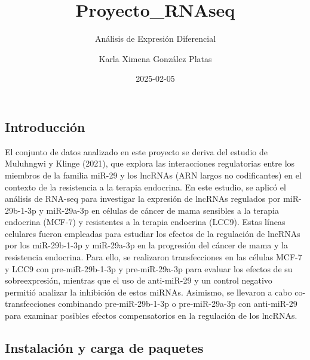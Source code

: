 \documentclass[
]{article}
\title{Proyecto\_RNAseq}
\subtitle{Análisis de Expresión Diferencial}
\author{Karla Ximena González Platas}
\date{2025-02-05}
\begin{document}
\maketitle

{
\setcounter{tocdepth}{2}
\tableofcontents
}
\subsection{Introducción}\label{introducciuxf3n}

El conjunto de datos analizado en este proyecto se deriva del estudio de
Muluhngwi y Klinge (2021), que explora las interacciones regulatorias
entre los miembros de la familia miR-29 y los lncRNAs (ARN largos no
codificantes) en el contexto de la resistencia a la terapia endocrina.
En este estudio, se aplicó el análisis de RNA-seq para investigar la
expresión de lncRNAs regulados por miR-29b-1-3p y miR-29a-3p en células
de cáncer de mama sensibles a la terapia endocrina (MCF-7) y resistentes
a la terapia endocrina (LCC9). Estas líneas celulares fueron empleadas
para estudiar los efectos de la regulación de lncRNAs por los
miR-29b-1-3p y miR-29a-3p en la progresión del cáncer de mama y la
resistencia endocrina. Para ello, se realizaron transfecciones en las
células MCF-7 y LCC9 con pre-miR-29b-1-3p y pre-miR-29a-3p para evaluar
los efectos de su sobreexpresión, mientras que el uso de anti-miR-29 y
un control negativo permitió analizar la inhibición de estos miRNAs.
Asimismo, se llevaron a cabo co-transfecciones combinando
pre-miR-29b-1-3p o pre-miR-29a-3p con anti-miR-29 para examinar posibles
efectos compensatorios en la regulación de los lncRNAs.

\subsection{Instalación y carga de
paquetes}\label{instalaciuxf3n-y-carga-de-paquetes}
\end{document}
